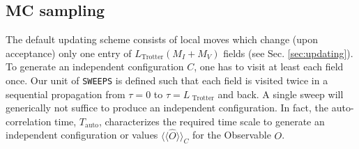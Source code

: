 %
\subsection{MC sampling}\label{sec:sampling}
%
The default updating scheme consists of local moves which change (upon acceptance) only one  entry of $L_{\mathrm{Trotter}}(M_I+M_V)$  fields (see Sec. \ref{sec:updating}). 
To generate  an independent configuration $C$,   one has to visit at least each field  once.  Our unit of  \texttt{SWEEPS}  is defined such that each field is visited twice in a sequential propagation from $\tau = 0$ to $\tau = L_{\text{ Trotter}}$  and back.  A single sweep will  generically not  suffice to produce an independent  configuration.
In fact, the auto-correlation time, $T_\mathrm{auto}$, characterizes the required time scale to generate an independent configuration or values $\langle\langle\hat{O}\rangle\rangle_C$ for the Observable $O$.

